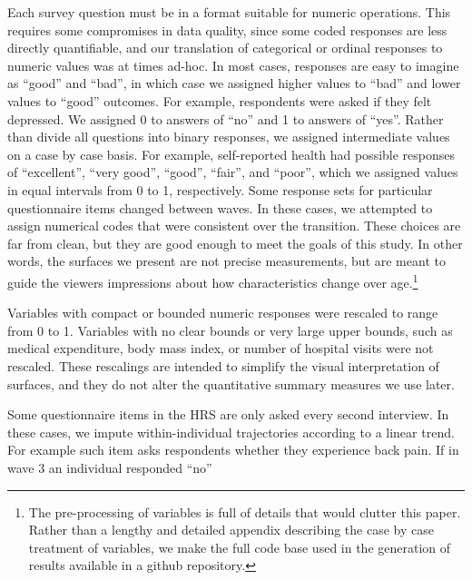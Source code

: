 \documentclass{article}
\begin{document}
Each survey question must be in a format suitable for numeric operations.
This requires some compromises in data quality, since some coded responses are less directly
quantifiable, and our translation of categorical or ordinal responses to numeric
values was at times ad-hoc. In most cases, responses are easy to imagine as
``good'' and ``bad'', in which case we assigned higher values to ``bad'' and
lower values to ``good'' outcomes. For example, respondents were asked if they
felt depressed. We assigned 0 to answers of ``no'' and 1 to answers of ``yes''.
Rather than divide all questions into binary responses, we assigned intermediate
values on a case by case basis. For example, self-reported health
had possible responses of ``excellent'', ``very good'', ``good'',
``fair'', and ``poor'', which we assigned values in equal intervals
from 0 to 1, respectively. Some response
sets for particular questionnaire items changed between
waves.
In these cases, we attempted to assign numerical codes that were consistent
over the transition. These choices are far from clean, but they are good enough
to meet the goals of this study. In other words, the surfaces we
present are not precise measurements, but are meant to guide the
viewers impressions about how characteristics change over age.\footnote{The
pre-processing of variables is full of details that would clutter this paper. Rather than a lengthy and detailed appendix describing the case by case treatment of variables, we make the full code base used in the generation of results available in a github repository.}

Variables with compact or bounded numeric responses were rescaled to range from
0 to 1. Variables with no clear bounds or very large upper
bounds, such as medical expenditure, body mass index, or number of hospital
visits were not rescaled. These rescalings are intended to simplify
the visual interpretation of surfaces, and they do not alter the
quantitative summary measures we use later. 

Some questionnaire items in the HRS are only asked every second interview. In
these cases, we impute within-individual trajectories according to a linear
trend. For example such item asks respondents whether they experience back
pain. If in wave 3 an individual responded ``no''
\end{document}
